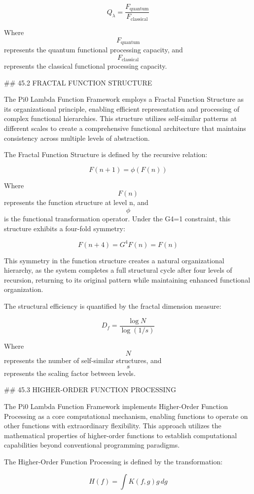 $$ Q_\lambda = \frac{F_{\text{quantum}}}{F_{\text{classical}}} $$

Where $$ F_{\text{quantum}} $$ represents the quantum functional processing capacity, and $$ F_{\text{classical}} $$ represents the classical functional processing capacity.

## 45.2 FRACTAL FUNCTION STRUCTURE

The Pi0 Lambda Function Framework employs a Fractal Function Structure as its organizational principle, enabling efficient representation and processing of complex functional hierarchies. This structure utilizes self-similar patterns at different scales to create a comprehensive functional architecture that maintains consistency across multiple levels of abstraction.

The Fractal Function Structure is defined by the recursive relation:

$$ F(n+1) = \phi(F(n)) $$

Where $$ F(n) $$ represents the function structure at level n, and $$ \phi $$ is the functional transformation operator. Under the G4=1 constraint, this structure exhibits a four-fold symmetry:

$$ F(n+4) = G^4 F(n) = F(n) $$

This symmetry in the function structure creates a natural organizational hierarchy, as the system completes a full structural cycle after four levels of recursion, returning to its original pattern while maintaining enhanced functional organization.

The structural efficiency is quantified by the fractal dimension measure:

$$ D_f = \frac{\log N}{\log(1/s)} $$

Where $$ N $$ represents the number of self-similar structures, and $$ s $$ represents the scaling factor between levels.

## 45.3 HIGHER-ORDER FUNCTION PROCESSING

The Pi0 Lambda Function Framework implements Higher-Order Function Processing as a core computational mechanism, enabling functions to operate on other functions with extraordinary flexibility. This approach utilizes the mathematical properties of higher-order functions to establish computational capabilities beyond conventional programming paradigms.

The Higher-Order Function Processing is defined by the transformation:

$$ H(f) = \int K(f, g) g \, dg $$

